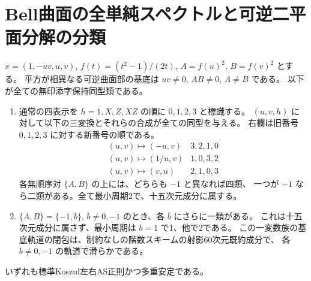 \section{Bell曲面の全単純スペクトルと可逆二平面分解の分類}
\label{sec:split-simple-surface}
\begin{theorem}\label{thm:split-simple-surface}
$x=(1,-uv,u,v)$, $f(t)=(t^2-1)/(2t)$, $A=f(u)^2$, $B=f(v)^2$ とする。
平方が相異なる可逆曲面部の基底は $uv\ne0$, $AB\ne0$, $A\ne B$ である。
以下が全ての無印添字保持同型類である。
\begin{enumerate}
\item 通常の四表示を $h=1,X,Z,XZ$ の順に $0,1,2,3$ と標識する。
$(u,v,h)$ に対して以下の三変換とそれらの合成が全ての同型を与える。
右欄は旧番号 $0,1,2,3$ に対する新番号の順である。
\[
\begin{array}{c|c}
(u,v)\mapsto(-u,v)&3,2,1,0\\
(u,v)\mapsto(1/u,v)&1,0,3,2\\
(u,v)\mapsto(v,u)&2,1,0,3
\end{array}
\]
各無順序対 $\{A,B\}$ の上には、どちらも $-1$ と異なれば四類、
一つが $-1$ なら二類がある。全て最小周期2で、十五次元成分に属する。
\item $\{A,B\}=\{-1,b\}$, $b\ne0,-1$ のとき、各 $b$ にさらに一類がある。
これは十五次元成分に属さず、最小周期は $b=1$ で1、他で2である。
この一変数族の基底軌道の閉包は、制約なしの階数スキームの射影60次元既約成分で、
各 $b\ne0,-1$ の軌道で滑らかである。
\end{enumerate}
いずれも標準Koszul左右AS正則かつ多重安定である。
\end{theorem}
